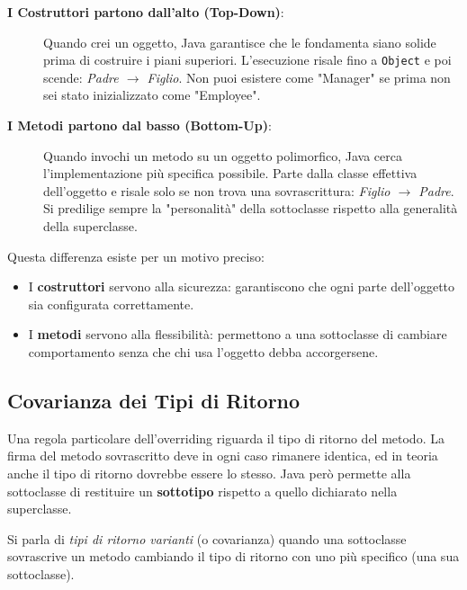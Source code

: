 \begin{description}
    \item[\textbf{I Costruttori partono dall'alto (Top-Down)}:] 
    Quando crei un oggetto, Java garantisce che le fondamenta siano solide prima di costruire i piani superiori. L'esecuzione risale fino a \texttt{Object} e poi scende: \textit{Padre $\rightarrow$ Figlio}. Non puoi esistere come "Manager" se prima non sei stato inizializzato come "Employee".
    
    \item[\textbf{I Metodi partono dal basso (Bottom-Up)}:] 
    Quando invochi un metodo su un oggetto polimorfico, Java cerca l'implementazione più specifica possibile. Parte dalla classe effettiva dell'oggetto e risale solo se non trova una sovrascrittura: \textit{Figlio $\rightarrow$ Padre}. Si predilige sempre la "personalità" della sottoclasse rispetto alla generalità della superclasse.
\end{description}



\begin{tip}
    Questa differenza esiste per un motivo preciso:
    \begin{itemize}
        \item I \textbf{costruttori} servono alla sicurezza: garantiscono che ogni parte dell'oggetto sia configurata correttamente.
        \item I \textbf{metodi} servono alla flessibilità: permettono a una sottoclasse di cambiare comportamento senza che chi usa l'oggetto debba accorgersene.
    \end{itemize}
\end{tip}

\subsection{Covarianza dei Tipi di Ritorno}

Una regola particolare dell'overriding riguarda il tipo di ritorno del metodo. La firma del metodo sovrascritto deve in ogni caso rimanere identica, ed in teoria anche il tipo di ritorno dovrebbe essere lo stesso. Java però permette alla sottoclasse di restituire un \textbf{sottotipo} rispetto a quello dichiarato nella superclasse.

\begin{observation}
    Si parla di \textit{tipi di ritorno varianti} (o covarianza) quando una sottoclasse sovrascrive un metodo cambiando il tipo di ritorno con uno più specifico (una sua sottoclasse).
\end{observation}

